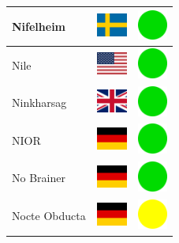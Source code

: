 \documentclass[12pt, a4paper, twoside]{report}
\begin{document}
\begin{center}
\begin{longtable}{|p{5cm}|p{2cm}|p{2cm}|}
Nifelheim & \includegraphics[width=1cm]{4x3/se} & \includegraphics[width=1cm]{likes/y} \\ \hline
Nile & \includegraphics[width=1cm]{4x3/us} & \includegraphics[width=1cm]{likes/y} \\ \hline
Ninkharsag & \includegraphics[width=1cm]{4x3/gb} & \includegraphics[width=1cm]{likes/y} \\ \hline
NIOR & \includegraphics[width=1cm]{4x3/de} & \includegraphics[width=1cm]{likes/y} \\ \hline
No Brainer & \includegraphics[width=1cm]{4x3/de} & \includegraphics[width=1cm]{likes/y} \\ \hline
Nocte Obducta & \includegraphics[width=1cm]{4x3/de} & \includegraphics[width=1cm]{likes/m} \\ \hline

\end{longtable}
\end{center}
\end{document}
